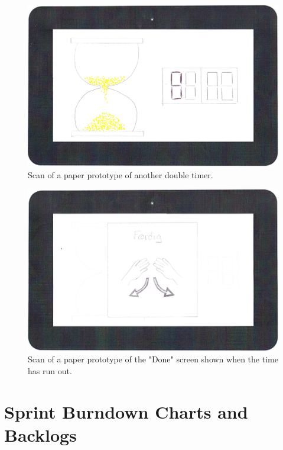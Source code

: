 	\begin{figure}[H]
		\centering
			\includegraphics[width=\textwidth]{Images/paper_prototype/timer_3.png}
				\caption{Scan of a paper prototype of another double timer.}
		\label{fig:pap_prot_timedoub2}
	\end{figure}

	\begin{figure}[H]
		\centering
			\includegraphics[width=\textwidth]{Images/paper_prototype/done.png}
				\caption{Scan of a paper prototype of the "Done" screen shown when the time has run out.}
		\label{fig:pap_prot_donescr}
	\end{figure}

\section{Sprint Burndown Charts and Backlogs}
\label{sec:burn_back}
	
